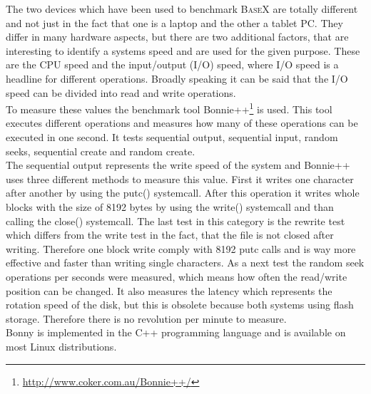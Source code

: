 The two devices which have been used to benchmark \textsc{BaseX} are totally different and not just in the fact that one is a laptop and the other a tablet PC.
They differ in many hardware aspects, but there are two additional factors, that are interesting to identify a systems speed and are used for the given purpose.
These are the CPU speed and the input/output (I/O) speed, where I/O speed is a headline for different operations.
Broadly speaking it can be said that the I/O speed can be divided into read and write operations.\\
To measure these values the benchmark tool Bonnie++\footnote{\url{http://www.coker.com.au/Bonnie++/}} is used.
This tool executes different operations and measures how many of these operations can be executed in one second.
It tests sequential output, sequential input, random seeks, sequential create and random create.\\
The sequential output represents the write speed of the system and Bonnie++ uses three different methods to measure this value.
First it writes one character after another by using the \textsf{putc()} systemcall. 
After this operation it writes whole blocks with the size of 8192 bytes by using the \textsf{write()} systemcall and than calling the \textsf{close()} systemcall.
The last test in this category is the rewrite test which differs from the write test in the fact, that the file is not closed after writing.
Therefore one block write comply with 8192 \textsf{putc} calls and is way more effective and faster than writing single characters.
As a next test the random seek operations per seconds were measured, which means how often the read/write position can be changed.
It also measures the latency which represents the rotation speed of the disk, but this is obsolete because both systems using flash storage.
Therefore there is no revolution per minute to measure.\\
Bonny is implemented in the C++ programming language and is available on most Linux distributions.
